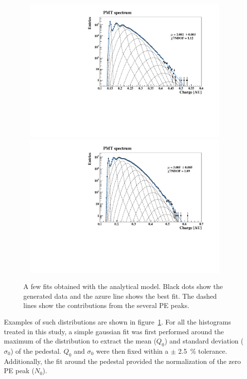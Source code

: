 \documentclass[preprint,12pt]{elsarticle}
\begin{document}
\begin{figure}[!t]
\centering
\includegraphics[width=11.0cm, height=7.25cm]{figures/mc-fit-2.pdf} \\
\includegraphics[width=11.0cm, height=7.25cm]{figures/mc-fit-3.pdf} \\
\caption{ A few fits obtained with the analytical model. 
Black dots show the generated data and the azure line shows the best fit. The dashed lines show the contributions from the several PE peaks. }
\label{fig:spes}
\end{figure}
Examples of such distributions are shown in figure~\ref{fig:spes}. 
For all the histograms treated in this study, a simple gaussian fit was first performed around the maximum of the distribution to extract the mean ($Q_0$) and standard deviation ($\sigma_0$) of the pedestal. 
$Q_0$ and $\sigma_0$ were then fixed within a $\pm$ 2.5~\% tolerance. 
Additionally, the fit around the pedestal provided the normalization of the zero PE peak ($N_0$). 
\end{document}
